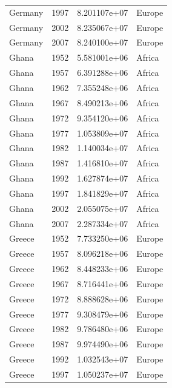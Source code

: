 \documentclass[
  letterpaper,
  DIV=11,
  numbers=noendperiod]{scrreprt}
\begin{document}
\begin{tcolorbox}
\begin{tabular}{lrrl}
Germany                  &  1997 &  8.201107e+07 &    Europe \\
Germany                  &  2002 &  8.235067e+07 &    Europe \\
Germany                  &  2007 &  8.240100e+07 &    Europe \\
Ghana                    &  1952 &  5.581001e+06 &    Africa \\
Ghana                    &  1957 &  6.391288e+06 &    Africa \\
Ghana                    &  1962 &  7.355248e+06 &    Africa \\
Ghana                    &  1967 &  8.490213e+06 &    Africa \\
Ghana                    &  1972 &  9.354120e+06 &    Africa \\
Ghana                    &  1977 &  1.053809e+07 &    Africa \\
Ghana                    &  1982 &  1.140034e+07 &    Africa \\
Ghana                    &  1987 &  1.416810e+07 &    Africa \\
Ghana                    &  1992 &  1.627874e+07 &    Africa \\
Ghana                    &  1997 &  1.841829e+07 &    Africa \\
Ghana                    &  2002 &  2.055075e+07 &    Africa \\
Ghana                    &  2007 &  2.287334e+07 &    Africa \\
Greece                   &  1952 &  7.733250e+06 &    Europe \\
Greece                   &  1957 &  8.096218e+06 &    Europe \\
Greece                   &  1962 &  8.448233e+06 &    Europe \\
Greece                   &  1967 &  8.716441e+06 &    Europe \\
Greece                   &  1972 &  8.888628e+06 &    Europe \\
Greece                   &  1977 &  9.308479e+06 &    Europe \\
Greece                   &  1982 &  9.786480e+06 &    Europe \\
Greece                   &  1987 &  9.974490e+06 &    Europe \\
Greece                   &  1992 &  1.032543e+07 &    Europe \\
Greece                   &  1997 &  1.050237e+07 &    Europe \\

\end{tabular}
\end{tcolorbox}
\end{document}
